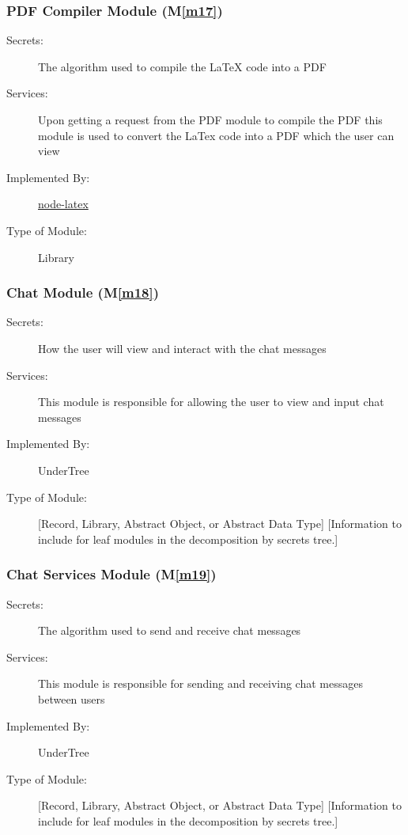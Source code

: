 \documentclass[12pt, titlepage]{article}
\newcommand{\mref}[1]{M\ref{#1}}
\begin{document}
	\subsubsection{PDF Compiler Module (\mref{m17})}
	
	\begin{description}
		\item[Secrets:] The algorithm used to compile the LaTeX code into a PDF
		\item[Services:] Upon getting a request from the PDF module to compile the PDF this module is used to convert the LaTex code into a PDF which the user can view
		\item[Implemented By:] \href{https://www.npmjs.com/package/node-latex}{node-latex}
		\item[Type of Module:] Library
	\end{description}
	
	\subsubsection{Chat Module (\mref{m18})}
	
	\begin{description}
		\item[Secrets:] How the user will view and interact with the chat messages
		\item[Services:] This module is responsible for allowing the user to view and input chat messages
		\item[Implemented By:] UnderTree
		\item[Type of Module:] [Record, Library, Abstract Object, or Abstract Data Type]
		[Information to include for leaf modules in the decomposition by secrets tree.]
	\end{description}
	
	\subsubsection{Chat Services Module (\mref{m19})}
	
	\begin{description}
		\item[Secrets:] The algorithm used to send and receive chat messages
		\item[Services:] This module is responsible for sending and receiving chat messages between users
		\item[Implemented By:] UnderTree
		\item[Type of Module:] [Record, Library, Abstract Object, or Abstract Data Type]
		[Information to include for leaf modules in the decomposition by secrets tree.]
	\end{description}
	
\end{document}
